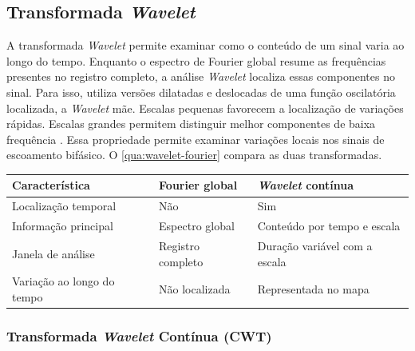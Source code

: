 \subsection{Transformada \textit{Wavelet}}\label{sec:wavelet}

A transformada \textit{Wavelet} permite examinar como o conteúdo de um sinal
varia ao longo do tempo. Enquanto o espectro de Fourier global resume as
frequências presentes no registro completo, a análise \textit{Wavelet} localiza essas
componentes no sinal. Para isso, utiliza versões dilatadas e deslocadas de uma
função oscilatória localizada, a \textit{Wavelet} mãe. Escalas pequenas favorecem a
localização de variações rápidas. Escalas grandes permitem distinguir melhor
componentes de baixa frequência \cite{torrence1998}. Essa propriedade permite
examinar variações locais nos sinais de escoamento bifásico.
O \autoref{qua:wavelet-fourier} compara as duas transformadas.

\begin{quadro}[!htbp]
  \centering
  \begin{threeparttable}
  \caption{Comparação entre a transformada de Fourier e a transformada \textit{Wavelet}.}
  \label{qua:wavelet-fourier}
  \begin{tabular}{lll}
    \hline
    \textbf{Característica}       & \textbf{Fourier global} & \textbf{\textit{Wavelet} contínua}   \\
    \hline
    Localização temporal          & Não                  & Sim                            \\
    Informação principal          & Espectro global      & Conteúdo por tempo e escala    \\
    Janela de análise              & Registro completo    & Duração variável com a escala  \\
    Variação ao longo do tempo     & Não localizada       & Representada no mapa           \\
    \hline
  \end{tabular}
  \end{threeparttable}
\end{quadro}

\subsubsection{Transformada \textit{Wavelet} Contínua (CWT)}\label{sec:cwt}

